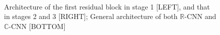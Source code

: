   \begin{figure}[htb]
 	\centering
 	\epsfxsize=5cm
 	{}\ \ \ \ \ \ \ \ \ \  \ \ \ \ \ \ \
 	\epsfxsize=6.75cm
 	{}\ \ \ \ \ \ \ \ \ \  \ \ \ \ \ \
 		\epsfxsize=5cm
 	{\epsfbox{ARCH}}
 	\caption{Architecture of the first residual block in stage 1 [LEFT], and that in stages 2 and 3 [RIGHT]; General architecture of both $\mathbb{R}$-CNN and $\mathbb{C}$-CNN [BOTTOM]}
 	\label{fig:architecture}
 \end{figure}
 

 
 